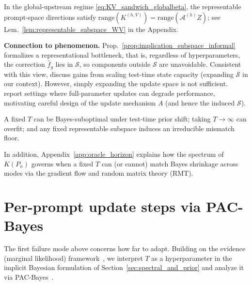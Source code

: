 \documentclass{article}
\theoremstyle{plain}
\theoremstyle{definition}
\theoremstyle{remark}
\begin{document}
In the global-upstream regime \eqref{eq:KV_sandwich_globalbeta}, the representable prompt-space directions satisfy
$\mathrm{range}(K^{(h,V)})=\mathrm{range}(\mathcal{A}^{(h)}Z)$; see Lem.~\ref{lem:representable_subspace_WV} in the
Appendix.

\textbf{Connection to phenomenon.}
Prop.~\ref{prop:implication_subspace_informal} formalizes a representational bottleneck, that is, regardless of hyperparameters, the correction $\hat f_g$ lies in $\mathcal S$, so components outside $\mathcal S$ are unavoidable. Consistent with this view, \citet{zhang2025test} discuss gains from scaling test-time state capacity (expanding $\mathcal{S}$ in our context). However, simply expanding the update space is not sufficient. \citet{10.1007/978-3-031-19827-4_26} report settings where full-parameter updates can degrade performance, motivating careful design of the update mechanism $A$ (and hence the induced $\mathcal S$).

\begin{takeawaybox}[title=\textbf{Takeaway (C1-2): why $T$ and $A$ must adapt}]
A fixed $T$ can be Bayes-suboptimal under test-time prior shift; taking $T\!\to\!\infty$ can overfit; and any fixed representable subspace induces an irreducible mismatch floor.
\end{takeawaybox}

In addition, Appendix~\ref{app:oracle_horizon} explains how the spectrum of $K(P_n)$ governs when a fixed $T$ can (or cannot) match Bayes shrinkage across modes via the gradient flow and random matrix theory (RMT).

\section{Per-prompt update steps via PAC-Bayes}\label{sec:eb_horizon_selection}

The first failure mode above concerns how far to adapt. 
Building on the evidence (marginal likelihood) framework~\citep{10.1162/neco.1992.4.5.720}, we interpret $T$ as a hyperparameter in the implicit Bayesian formulation of Section~\ref{sec:spectral_and_prior} and analyze it via PAC-Bayes~\citep{Catoni2007PACBayes,alquier2024user}.
\end{document}
